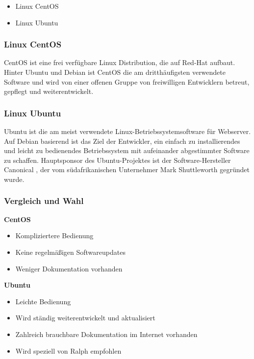 \begin{itemize}
\tightlist
\item
  Linux CentOS
\item
  Linux Ubuntu
\end{itemize}

\hypertarget{linux-centos}{%
\subsubsection{Linux CentOS}\label{linux-centos}}

CentOS ist eine frei verfügbare Linux Distribution, die auf Red-Hat
\cite{redhat} aufbaut. Hinter Ubuntu und Debian ist CentOS die am
dritthäufigsten verwendete Software und wird von einer offenen Gruppe
von freiwilligen Entwicklern betreut, gepflegt und weiterentwickelt.

\hypertarget{linux-ubuntu}{%
\subsubsection{Linux Ubuntu}\label{linux-ubuntu}}

Ubuntu ist die am meist verwendete Linux-Betriebssystemsoftware für
Webserver. Auf Debian basierend ist das Ziel der Entwickler, ein einfach
zu installierendes und leicht zu bedienendes Betriebssystem mit
aufeinander abgestimmter Software zu schaffen. Hauptsponsor des
Ubuntu-Projektes ist der Software-Hersteller Canonical \cite{canonical},
der vom südafrikanischen Unternehmer Mark Shuttleworth \cite{mark}
gegründet wurde.

\hypertarget{vergleich-und-wahl}{%
\subsubsection{Vergleich und Wahl}\label{vergleich-und-wahl}}

\textbf{CentOS}

\begin{itemize}
\tightlist
\item
  Kompliziertere Bedienung
\item
  Keine regelmäßigen Softwareupdates
\item
  Weniger Dokumentation vorhanden
\end{itemize}

\textbf{Ubuntu}

\begin{itemize}
\tightlist
\item
  Leichte Bedienung
\item
  Wird ständig weiterentwickelt und aktualisiert
\item
  Zahlreich brauchbare Dokumentation im Internet vorhanden
\item
  Wird speziell von Ralph empfohlen
\end{itemize}

